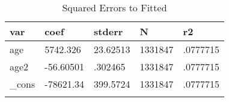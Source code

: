 \documentclass{article}
\begin{document}
\begin{table}[tbp] \centering
{}

\caption{Squared Errors to Fitted}
\begin{tabularx}{\textwidth}{lCCCC}

\toprule
{var}&{coef}&{stderr}&{N}&{r2} \tabularnewline
\midrule\addlinespace[1.5ex]
age&5742.326&23.62513&1331847&.0777715 \tabularnewline
age2&-56.60501&.302465&1331847&.0777715 \tabularnewline
\_cons&-78621.34&399.5724&1331847&.0777715 \tabularnewline
\bottomrule \addlinespace[1.5ex]

\end{tabularx}
\end{table}
\end{document}
